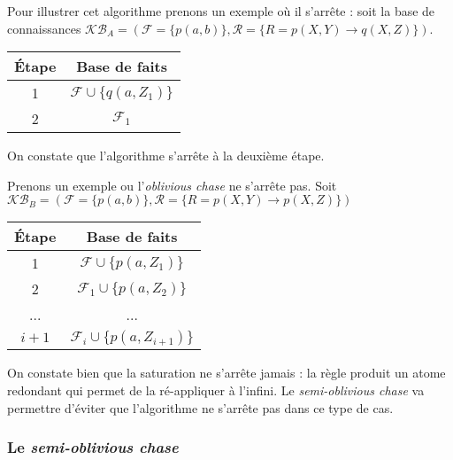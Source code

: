 Pour illustrer cet algorithme prenons un exemple où il s'arrête : soit la base de connaissances $\mathcal{KB}_A = (\mathcal{F} = \{p(a,b)\}, \mathcal{R} = \{R = p(X,Y) \rightarrow q(X,Z) \})$.
\begin{center}
\begin{tabular}{|c|c|}
    \hline
    Étape & Base de faits  \\ 
    \hline
    1 &$\mathcal{F} \cup \{q(a, Z_1)\}$ \\ 
    \hline
    2 &$\mathcal{F}_1$  \\
    \hline
\end{tabular}
\end{center}
On constate que l'algorithme s'arrête à la deuxième étape.
\par Prenons un exemple ou l'\textit{oblivious chase} ne s'arrête pas. Soit
$\mathcal{KB}_B = (\mathcal{F} = \{p(a,b)\}, \mathcal{R} = \{R = p(X,Y) \rightarrow p(X,Z) \})$

\begin{center}
\begin{tabular}{|c|c|}
    \hline
    Étape & Base de faits  \\ 
    \hline
    1 &$\mathcal{F} \cup \{p(a, Z_1)\}$ \\ 
    \hline
    2 &$\mathcal{F}_1 \cup \{p(a, Z_2)\}$ \\
    \hline
    ... & ... \\
    \hline
    $i+1$ & $\mathcal{F}_i \cup \{p(a, Z_{i+1})\} $ \\
    \hline
\end{tabular}
\end{center}

On constate bien que la saturation ne s'arrête jamais : la règle produit un atome redondant qui permet de la ré-appliquer à l'infini. Le \textit{semi-oblivious chase} va permettre d'éviter que l'algorithme ne s'arrête pas dans ce type de cas.

\subsubsection{Le \textit{semi-oblivious chase}}\label{sec:semi_oblivious_chase}


